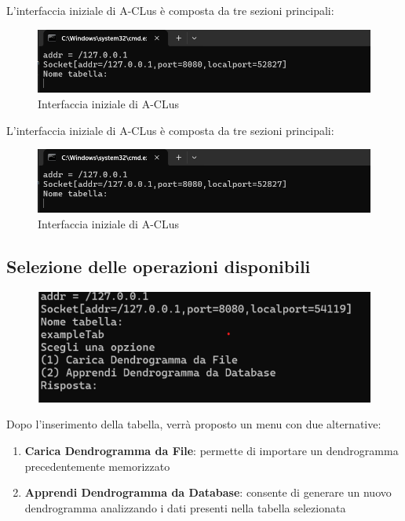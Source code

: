 L'interfaccia iniziale di A-CLus è composta da tre sezioni principali:

\begin{figure}[h!]
    \centering
    \includegraphics[width=\textwidth]{images/client in esecuzione.png}
    \caption{Interfaccia iniziale di A-CLus}
\end{figure}

L'interfaccia iniziale di A-CLus è composta da tre sezioni principali:

\begin{figure}[h!]
    \centering
    \includegraphics[width=\textwidth]{images/client in esecuzione.png}
    \caption{Interfaccia iniziale di A-CLus}
\end{figure}

\subsection{Selezione delle operazioni disponibili}

\begin{figure}[h!]
    \centering
    \includegraphics[width=\textwidth]{images/inserimento_tabella.png}
\end{figure}

Dopo l'inserimento della tabella, verrà proposto un menu con due alternative:
\begin{enumerate}
    \item \textbf{Carica Dendrogramma da File}: permette di importare un dendrogramma precedentemente memorizzato
    \item \textbf{Apprendi Dendrogramma da Database}: consente di generare un nuovo dendrogramma analizzando i dati presenti nella tabella selezionata
\end{enumerate}


